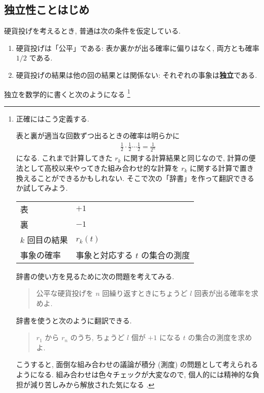 \documentclass[openany, a4paper, oneside]{jsbook}
\begin{document}
\subsection{独立性ことはじめ \label{Hinashiro_math_party_1_probability_13}}

硬貨投げを考えるとき, 普通は次の条件を仮定している.
\begin{enumerate}
\item 硬貨投げは「公平」である: 表か裏かが出る確率に偏りはなく, 両方とも確率 $1/2$ である.
\item 硬貨投げの結果は他の回の結果とは関係ない: それぞれの事象は\textbf{独立}である.
\end{enumerate}
独立を数学的に書くと次のようになる \footnote{正確にはこう定義する.

表と裏が適当な回数ずつ出るときの確率は明らかに
\begin{align}
 \frac{1}{2} \cdot \frac{1}{2} \cdots \frac{1}{2}
 =
 \frac{1}{2^n}
\end{align}
になる.
これまで計算してきた $r_k$ に関する計算結果と同じなので,
計算の便法として高校以来やってきた組み合わせ的な計算を $r_k$ に関する計算で置き換えることができるかもしれない.
そこで次の「辞書」を作って翻訳できるか試してみよう.
\begin{center}
\begin{tabular}{ll}
表 & $+1$\\
裏 & $-1$\\
$k$ 回目の結果 & $r_k (t)$\\
事象の確率 & 事象と対応する $t$ の集合の測度\\
\end{tabular}
\end{center}
辞書の使い方を見るために次の問題を考えてみる.
\begin{quote}
公平な硬貨投げを $n$ 回繰り返すときにちょうど $l$ 回表が出る確率を求めよ.
\end{quote}
辞書を使うと次のように翻訳できる.
\begin{quote}
$r_1$ から $r_n$ のうち, ちょうど $l$ 個が $+1$ になる $t$ の集合の測度を求めよ.
\end{quote}
こうすると, 面倒な組み合わせの議論が積分 (測度) の問題として考えられるようになる.
組み合わせは色々チェックが大変なので, 個人的には精神的な負担が減り苦しみから解放された気になる \footnotemark.}
\end{document}
